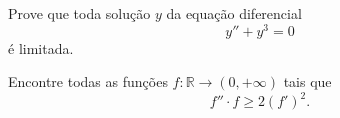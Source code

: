 \documentclass[10pt,a4paper]{amsart}
\newcommand{\R}{\mathbb{R}}
\begin{document}
\vspace{5mm}

 Prove que toda solução $y$ da equação diferencial
    \[
    y'' + y^3 = 0
    \]
    é limitada. 

\vspace{5mm}

 Encontre todas as funções $f: \R \to (0,+\infty)$ tais que 
\[
f'' \cdot f \geq 2(f')^2.
\]
\end{document}
